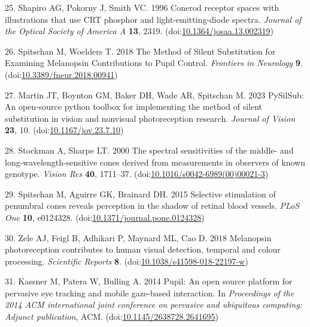 \documentclass[
]{article}
\begin{document}
\leavevmode\hypertarget{ref-Shapiro1996}{}%
25. Shapiro AG, Pokorny J, Smith VC. 1996 Conerod receptor spaces with illustrations that use CRT phosphor and light-emitting-diode spectra. \emph{Journal of the Optical Society of America A} \textbf{13}, 2319. (doi:\href{https://doi.org/10.1364/josaa.13.002319}{10.1364/josaa.13.002319})

\leavevmode\hypertarget{ref-Spitschan2018}{}%
26. Spitschan M, Woelders T. 2018 The Method of Silent Substitution for Examining Melanopsin Contributions to Pupil Control. \emph{Frontiers in Neurology} \textbf{9}. (doi:\href{https://doi.org/10.3389/fneur.2018.00941}{10.3389/fneur.2018.00941})

\leavevmode\hypertarget{ref-Martin2023}{}%
27. Martin JT, Boynton GM, Baker DH, Wade AR, Spitschan M. 2023 PySilSub: An open-source python toolbox for implementing the method of silent substitution in vision and nonvisual photoreception research. \emph{Journal of Vision} \textbf{23}, 10. (doi:\href{https://doi.org/10.1167/jov.23.7.10}{10.1167/jov.23.7.10})

\leavevmode\hypertarget{ref-Stockman2000}{}%
28. Stockman A, Sharpe LT. 2000 The spectral sensitivities of the middle- and long-wavelength-sensitive cones derived from measurements in observers of known genotype. \emph{Vision Res} \textbf{40}, 1711--37. (doi:\href{https://doi.org/10.1016/s0042-6989(00)00021-3}{10.1016/s0042-6989(00)00021-3})

\leavevmode\hypertarget{ref-Spitschan2015}{}%
29. Spitschan M, Aguirre GK, Brainard DH. 2015 Selective stimulation of penumbral cones reveals perception in the shadow of retinal blood vessels. \emph{PLoS One} \textbf{10}, e0124328. (doi:\href{https://doi.org/10.1371/journal.pone.0124328}{10.1371/journal.pone.0124328})

\leavevmode\hypertarget{ref-Zele2018}{}%
30. Zele AJ, Feigl B, Adhikari P, Maynard ML, Cao D. 2018 Melanopsin photoreception contributes to human visual detection, temporal and colour processing. \emph{Scientific Reports} \textbf{8}. (doi:\href{https://doi.org/10.1038/s41598-018-22197-w}{10.1038/s41598-018-22197-w})

\leavevmode\hypertarget{ref-Kassner2014}{}%
31. Kassner M, Patera W, Bulling A. 2014 Pupil: An open source platform for pervasive eye tracking and mobile gaze-based interaction. In \emph{Proceedings of the 2014 ACM international joint conference on pervasive and ubiquitous computing: Adjunct publication}, ACM. (doi:\href{https://doi.org/10.1145/2638728.2641695}{10.1145/2638728.2641695})
\end{document}
